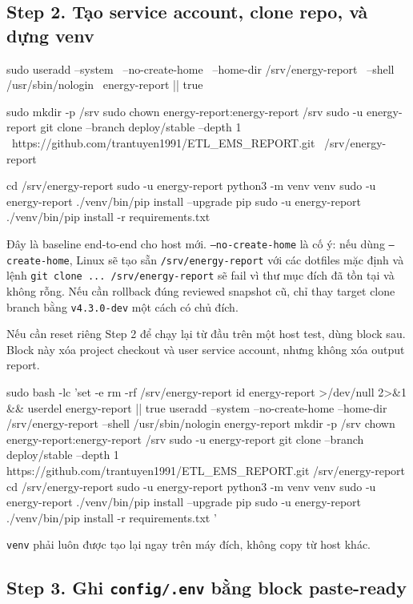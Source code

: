 \subsection{Step 2. Tạo service account, clone repo, và dựng venv}

\begin{ShellBlock}
sudo useradd --system \
  --no-create-home \
  --home-dir /srv/energy-report \
  --shell /usr/sbin/nologin \
  energy-report || true

sudo mkdir -p /srv
sudo chown energy-report:energy-report /srv
sudo -u energy-report git clone --branch deploy/stable --depth 1 \
  https://github.com/trantuyen1991/ETL_EMS_REPORT.git \
  /srv/energy-report

cd /srv/energy-report
sudo -u energy-report python3 -m venv venv
sudo -u energy-report ./venv/bin/pip install --upgrade pip
sudo -u energy-report ./venv/bin/pip install -r requirements.txt
\end{ShellBlock}

Đây là baseline end-to-end cho host mới. \texttt{--no-create-home} là cố ý: nếu dùng \texttt{--create-home}, Linux sẽ tạo sẵn \texttt{/srv/energy-report} với các dotfiles mặc định và lệnh \texttt{git clone ... /srv/energy-report} sẽ fail vì thư mục đích đã tồn tại và không rỗng. Nếu cần rollback đúng reviewed snapshot cũ, chỉ thay target clone branch bằng \texttt{v4.3.0-dev} một cách có chủ đích.

Nếu cần reset riêng Step 2 để chạy lại từ đầu trên một host test, dùng block sau. Block này xóa project checkout và user service account, nhưng không xóa output report.

\begin{ShellBlock}
sudo bash -lc 'set -e
rm -rf /srv/energy-report
id energy-report >/dev/null 2>&1 && userdel energy-report || true
useradd --system --no-create-home --home-dir /srv/energy-report --shell /usr/sbin/nologin energy-report
mkdir -p /srv
chown energy-report:energy-report /srv
sudo -u energy-report git clone --branch deploy/stable --depth 1 https://github.com/trantuyen1991/ETL_EMS_REPORT.git /srv/energy-report
cd /srv/energy-report
sudo -u energy-report python3 -m venv venv
sudo -u energy-report ./venv/bin/pip install --upgrade pip
sudo -u energy-report ./venv/bin/pip install -r requirements.txt
'
\end{ShellBlock}

\texttt{venv} phải luôn được tạo lại ngay trên máy đích, không copy từ host khác.

\subsection{Step 3. Ghi \texttt{config/.env} bằng block paste-ready}

